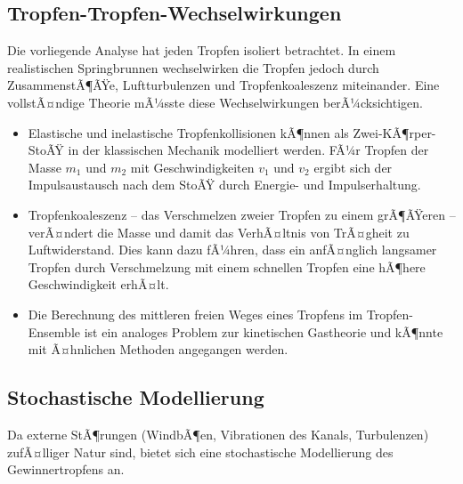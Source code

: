 ﻿\documentclass[a4paper,12pt]{article}
\theoremstyle{definition}
\begin{document}
\subsection{Tropfen-Tropfen-Wechselwirkungen}

Die vorliegende Analyse hat jeden Tropfen isoliert betrachtet. In einem realistischen
Springbrunnen wechselwirken die Tropfen jedoch durch ZusammenstÃ¶ÃŸe, Luftturbulenzen
und Tropfenkoaleszenz miteinander. Eine vollstÃ¤ndige Theorie mÃ¼sste diese
Wechselwirkungen berÃ¼cksichtigen.

\begin{itemize}
    \item Elastische und inelastische Tropfenkollisionen kÃ¶nnen als Zwei-KÃ¶rper-StoÃŸ
          in der klassischen Mechanik modelliert werden. FÃ¼r Tropfen der Masse $m_1$
          und $m_2$ mit Geschwindigkeiten $v_1$ und $v_2$ ergibt sich der Impulsaustausch
          nach dem StoÃŸ durch Energie- und Impulserhaltung.
    \item Tropfenkoaleszenz -- das Verschmelzen zweier Tropfen zu einem grÃ¶ÃŸeren --
          verÃ¤ndert die Masse und damit das VerhÃ¤ltnis von TrÃ¤gheit zu Luftwiderstand.
          Dies kann dazu fÃ¼hren, dass ein anfÃ¤nglich langsamer Tropfen durch Verschmelzung
          mit einem schnellen Tropfen eine hÃ¶here Geschwindigkeit erhÃ¤lt.
    \item Die Berechnung des mittleren freien Weges eines Tropfens im Tropfen-Ensemble
          ist ein analoges Problem zur kinetischen Gastheorie und kÃ¶nnte mit Ã¤hnlichen
          Methoden angegangen werden.
\end{itemize}

\subsection{Stochastische Modellierung}

Da externe StÃ¶rungen (WindbÃ¶en, Vibrationen des Kanals, Turbulenzen) zufÃ¤lliger Natur sind,
bietet sich eine stochastische Modellierung des Gewinnertropfens an.
\end{document}
